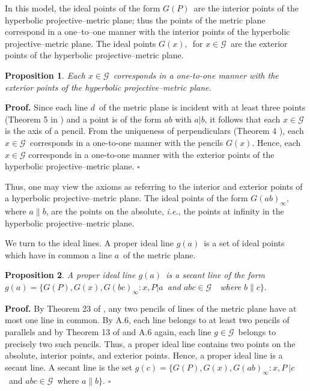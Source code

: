 \documentclass[a4paper,twoside,12pt]{article}
\newtheorem{prop}{Proposition}[section]
\newenvironment{proof}{\medskip \noindent 
            {\bf Proof.}}{ \hfill $\square$ \medskip}
\begin{document}
     In this model, the ideal points of the form $G(P)$\ are the
interior points of the hyperbolic projective--metric plane; thus the
points of the metric plane correspond in a one--to--one manner with the
interior points of the hyperbolic projective--metric plane. The ideal
points $G(x),$\ for $x\in \mathcal{G}$\ are the exterior points of the
hyperbolic projective--metric plane.

\begin{prop} Each $x\in \mathcal{G}$\ corresponds in a one-to-one
manner with the exterior points of the hyperbolic projective--metric plane.
\end{prop}

\begin{proof} Since each line $d$\ of the metric plane is incident with at
least three points (Theorem 5 in \cite{BBPW}) and a point is of the form $ab$
with $a | b$, it follows that each $x\in\mathcal{G}$ is the axis of a 
pencil. From the uniqueness of perpendiculars (Theorem 4 \cite{BBPW}), 
each $x\in \mathcal{G}$\ corresponds in a one-to-one manner with the 
pencils $G(x)$. Hence, each $x\in \mathcal{G}$ corresponds in a one-to-one 
manner with the exterior points of the hyperbolic projective--metric plane.
\end{proof}

     Thus, one may view the axioms as referring to the interior and exterior
points of a hyperbolic projective--metric plane. The ideal points of the
form $G(ab)_{\infty }$, where $a\parallel b$, are the points on the
absolute, {\it i.e.}, the points at infinity in the hyperbolic
projective--metric plane.

     We turn to the ideal lines. A proper ideal line $g(a)$\ is a set of
ideal points which have in common a line $a$\ of the metric plane.

\begin{prop} A proper ideal line $g(a)$\ is a secant line of the
form \newline
$g(a)=\{G(P),G(x),G(bc)_{\infty }:x,P|a$\ and $abc\in \mathcal{G}$\ \
where $b\parallel c\}.$
\end{prop}

\begin{proof} By Theorem 23 of \cite{BBPW}, any two pencils of lines of the
metric plane have at most one line in common. By A.6, each line belongs to at
least two pencils of parallels and by Theorem 13 of \cite{BBPW} and A.6 
again, each line $g\in \mathcal{G}$\ belongs to precisely two such pencils. 
Thus, a proper ideal line contains two points on the absolute, interior 
points, and exterior points. Hence, a proper ideal line is a secant line. 
A secant line is the set \newline
$g(c)=\{G(P),G(x),G(ab)_{\infty }:x,P\ |c$\ and $abc\in 
\mathcal{G}$\ where $a\parallel b\}$.
\end{proof}
\end{document}
